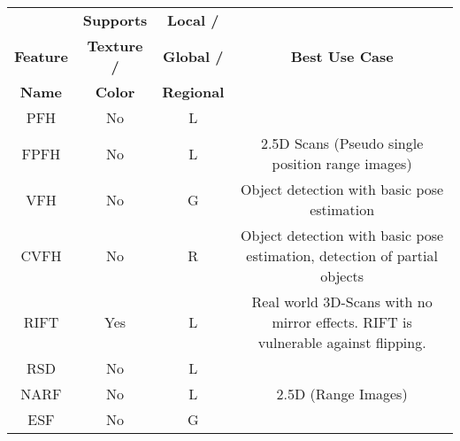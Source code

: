 \begin{tabular}{c|c|c|c}
    \small
    & \textbf{Supports} & \textbf{Local /} & \\
    \textbf{Feature} & \textbf{Texture /} & \textbf{Global /} & \textbf{Best Use Case} \\
    \textbf{Name} & \textbf{Color} & \textbf{Regional} & \\ \hline
    PFH	& No	& L &	\\
FPFH	& No	& L &	2.5D Scans (Pseudo single position range images) \\ \hline
VFH	& No	& G &	Object detection with basic pose estimation \\
CVFH	& No	& R &	Object detection with basic pose estimation, detection of partial objects \\ \hline
RIFT	& Yes	& L &	Real world 3D-Scans with no mirror effects. RIFT is vulnerable against flipping. \\
RSD	& No	& L &	 \\ \hline
NARF	& No	& L &	2.5D (Range Images) \\
ESF	& No	& G &	 \\
\end{tabular}
